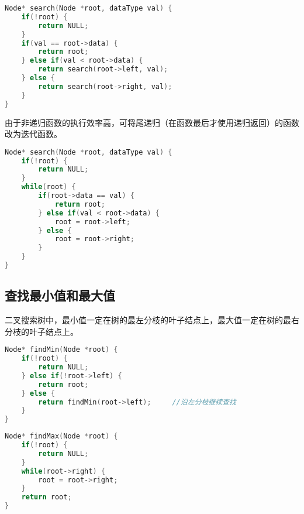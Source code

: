 
\begin{lstlisting}[language=C]
Node* search(Node *root, dataType val) {
    if(!root) {
        return NULL;
    }
    if(val == root->data) {
        return root;
    } else if(val < root->data) {
        return search(root->left, val);
    } else {
        return search(root->right, val);
    }
}
\end{lstlisting}

由于非递归函数的执行效率高，可将尾递归（在函数最后才使用递归返回）的函数改为迭代函数。\\


\begin{lstlisting}[language=C]
Node* search(Node *root, dataType val) {
    if(!root) {
        return NULL;
    }  
    while(root) {
        if(root->data == val) {
            return root;
        } else if(val < root->data) {
            root = root->left;
        } else {
            root = root->right;
        }
    }
}
\end{lstlisting}

\vspace{0.5cm}

\subsection{查找最小值和最大值}

二叉搜索树中，最小值一定在树的最左分枝的叶子结点上，最大值一定在树的最右分枝的叶子结点上。\\


\begin{lstlisting}[language=C]
Node* findMin(Node *root) {
    if(!root) {
        return NULL;
    } else if(!root->left) {
        return root;
    } else {
        return findMin(root->left);		//沿左分枝继续查找
    }
}
\end{lstlisting}

\vspace{0.5cm}


\begin{lstlisting}[language=C]
Node* findMax(Node *root) {
    if(!root) {
        return NULL;
    } 
    while(root->right) {
        root = root->right;
    }
    return root;
}
\end{lstlisting}

